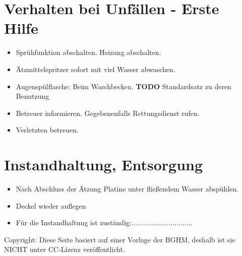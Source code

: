 \documentclass[fontsize=9pt]{scrartcl}
\newenvironment{smallitemize}{\begin{itemize}\itemsep -3pt}{\end{itemize}}
\begin{document}
\section{Verhalten bei Unfällen - Erste Hilfe}
\begin{smallitemize}
	\item Sprühfunktion abschalten. Heizung abschalten.
	\item Ätzmittelspritzer sofort mit viel Wasser abwaschen.
	\item Augenspülflasche: Beim Waschbecken. \textbf{TODO} Standardsatz zu deren Benutzung
	\item Betreuer informieren. Gegebenenfalls Rettungsdienst rufen.
	\item Verletzten betreuen.
\end{smallitemize}

\section{Instandhaltung, Entsorgung}
\begin{smallitemize}
	\item Nach Abschluss der Ätzung Platine unter fließendem Wasser abspühlen.
	\item Deckel wieder auflegen 
		\vspace{5mm}
	\item Für die Instandhaltung ist zuständig:...............................
\end{smallitemize}
\vfill
Copyright:  Diese Seite basiert auf einer Vorlage der BGHM, deshalb ist sie NICHT unter CC-Lizenz veröffentlicht.
\end{document}
